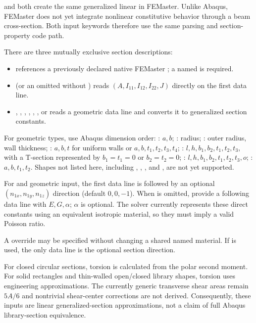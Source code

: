 
 and  both create the same generalized linear  in FEMaster. Unlike Abaqus, FEMaster does not yet integrate nonlinear constitutive behavior through a beam cross-section. Both input keywords therefore use the same parsing and section-property code path.

There are three mutually exclusive section descriptions:

\begin{itemize}
  \item {} references a previously declared native FEMaster ; a named  is required.
  \item {} (or an omitted  without ) reads \((A,I_{11},I_{12},I_{22},J)\) directly on the first data line.
  \item {}, , , , , , or  reads a geometric data line and converts it to generalized section constants.
\end{itemize}

For geometric types, use Abaqus dimension order: : \(a,b\); : radius; : outer radius, wall thickness; : \(a,b,t\) for uniform walls or \(a,b,t_1,t_2,t_3,t_4\); : \(l,h,b_1,b_2,t_1,t_2,t_3\), with a T-section represented by \(b_1=t_1=0\) or \(b_2=t_2=0\); : \(l,h,b_1,b_2,t_1,t_2,t_3,o\); : \(a,b,t_1,t_2\). Shapes not listed here, including , , , and , are not yet supported.

For  and geometric input, the first data line is followed by an optional \((n_{1x},n_{1y},n_{1z})\) direction (default \(0,0,-1\)). When  is omitted, provide a following data line with \(E,G,\alpha\); \(\alpha\) is optional. The solver currently represents these direct constants using an equivalent isotropic material, so they must imply a valid Poisson ratio.

A  override may be specified without changing a shared named material. If  is used, the only data line is the optional section direction.

For closed circular sections, torsion is calculated from the polar second moment. For solid rectangles and thin-walled open/closed library shapes, torsion uses engineering approximations. The currently generic transverse shear areas remain \(5A/6\) and nontrivial shear-center corrections are not derived. Consequently, these inputs are linear generalized-section approximations, not a claim of full Abaqus library-section equivalence.

